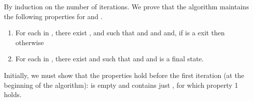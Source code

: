 \documentclass{LMCS}
\theoremstyle{definition} \newtheorem{property}[thm]{Property}
\begin{document}
\proof By induction on the number of iterations. 
We prove that the algorithm maintains the following properties for
\seen{} and \finals{}.
\begin{enumerate}
\item \label{thm:sum/tion-complete,prop-non-final}
  For each  in \seen, 
  there exist \astato, \astatw{} and  such that 
   and
   and  and,
  if \lstatw{} is a \dlceval{} exit then 
  otherwise 
\item \label{thm:sum/tion-complete,prop-final}
  For each \lstat{} in \finals, there exist \astat{} and  such that
   and  and
  \astat{} is a final state.
\end{enumerate}
Initially, we must show that the properties hold before the first iteration 
(at the beginning of the algorithm):
\finals{} is empty and \work{} contains just ,
for which property 1 holds.
\end{document}
